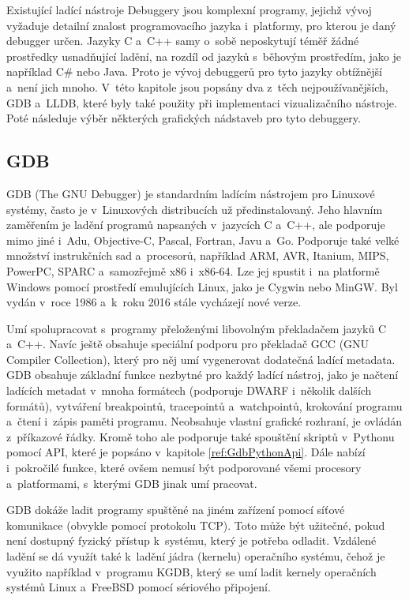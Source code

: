 \documentclass[czech,bachelor,male,python,dept460,hidelinks]{diploma}						%
\newcommand{\parspace}[1][]{
	\ifthenelse{\isempty{#1}}{\vspace{0mm}}{\vspace{#1}}
	\par
}
\begin{document}
\begin{section}{Existující ladící nástroje}
\label{sec:ExistingDebuggers}
	Debuggery jsou komplexní programy, jejichž vývoj vyžaduje detailní znalost programovacího jazyka i~platformy, pro kterou je daný debugger určen.
	Jazyky C a~C++ samy o~sobě neposkytují téměř žádné prostředky usnadňující ladění, na rozdíl od jazyků s~běhovým prostředím, jako je například C\# nebo Java.
	Proto je vývoj debuggerů pro tyto jazyky obtížnější a~není jich mnoho. V~této kapitole jsou popsány dva z~těch nejpoužívanějších,
	GDB a~LLDB, které byly také použity při implementaci vizualizačního nástroje. Poté následuje výběr některých grafických nádstaveb pro tyto debuggery.

	\subsection{GDB}
		GDB (The GNU Debugger) je standardním ladícím nástrojem pro Linuxové systémy, často je v~Linuxových distribucích už předinstalovaný.
		Jeho hlavním zaměřením je ladění programů napsaných v~jazycích C a~C++, ale podporuje mimo jiné i~Adu, Objective-C, Pascal, Fortran, Javu
		a~Go. \cite{gdb-languages} Podporuje také velké množství instrukčních sad a~procesorů, například ARM, AVR, Itanium, MIPS, PowerPC, SPARC
		a~samozřejmě x86 i~x86-64. Lze jej spustit i~na platformě Windows pomocí prostředí emulujících Linux, jako je Cygwin nebo MinGW.
		Byl vydán v~roce 1986 a~k~roku 2016 stále vycházejí nové verze.
		
		\parspace Umí spolupracovat s~programy přeloženými libovolným překladačem jazyků C a~C++. Navíc ještě obsahuje
		speciální podporu pro překladač GCC (GNU Compiler Collection), který pro něj umí vygenerovat dodatečná ladící metadata.
		GDB obsahuje základní funkce nezbytné pro každý ladící nástroj, jako je načtení ladících metadat v~mnoha formátech (podporuje DWARF i~několik dalších
		formátů), vytváření breakpointů, tracepointů a~watchpointů, krokování programu a~čtení i~zápis paměti programu.
		Neobsahuje vlastní grafické rozhraní, je ovládán z~příkazové řádky. Kromě toho ale podporuje také spouštění skriptů v~Pythonu pomocí API,
		které je popsáno v~kapitole \ref{ref:GdbPythonApi}.
		Dále nabízí i~pokročilé funkce, které ovšem nemusí být podporované všemi procesory a~platformami, s~kterými GDB jinak umí pracovat.
		
		\parspace GDB dokáže ladit programy spuštěné na jiném zařízení pomocí síťové komunikace (obvykle pomocí protokolu TCP).
		Toto může být užitečné, pokud není dostupný fyzický přístup k~systému, který je potřeba odladit.
		Vzdálené ladění se dá využít také k~ladění jádra (kernelu) operačního systému, čehož je využito například v~programu KGDB, který se umí ladit
		kernely operačních systémů Linux a~FreeBSD pomocí sériového připojení.
		

\end{section}
\end{document}
